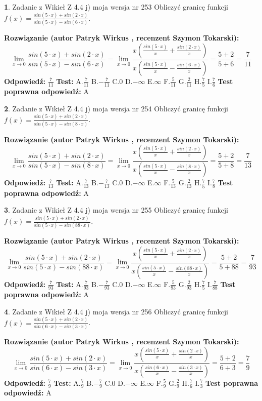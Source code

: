 \documentclass[12pt, a4paper]{article}
\theoremstyle{definition} %
\newtheorem{zad}{}
\newcommand{\zadStart}[1]{\begin{zad}#1\newline}
\newcommand{\zadStop}{\end{zad}}
\newcommand{\rozwStart}[2]{\noindent \textbf{Rozwiązanie (autor #1 , recenzent #2): }\newline}
\newcommand{\rozwStop}{\newline}
\newcommand{\odpStart}{\noindent \textbf{Odpowiedź:}\newline}
\newcommand{\odpStop}{\newline}
\newcommand{\testStart}{\noindent \textbf{Test:}\newline}
\newcommand{\testStop}{\newline}
\newcommand{\kluczStart}{\noindent \textbf{Test poprawna odpowiedź:}\newline}
\newcommand{\kluczStop}{\newline}
\begin{document}
\zadStart{Zadanie z Wikieł Z 4.4 j) moja wersja nr 253}
Obliczyć granicę funkcji $f(x)=\frac{sin(5\cdot x) +sin(2\cdot x)}{sin(5\cdot x) -sin(6\cdot x)}$.
\zadStop
\rozwStart{Patryk Wirkus}{Szymon Tokarski}
$$\lim\limits_{x\to 0}\frac{sin(5\cdot x) +sin(2\cdot x)}{sin(5\cdot x) -sin(6\cdot x)}=\lim\limits_{x\to 0}\frac{x(\frac{sin(5\cdot x)}{x}+\frac{sin(2\cdot x)}{x})}{x(\frac{sin(5\cdot x)}{x}-\frac{sin(6\cdot x)}{x})}=\frac{5+2}{5+6} = \frac{7}{11}$$
\rozwStop
\odpStart
$\frac{7}{11}$
\odpStop
\testStart
A.$\frac{7}{11}$
B.$-\frac{7}{11}$
C.$0$
D.$-\infty$
E.$\infty$
F.$\frac{5}{11}$
G.$\frac{2}{11}$
H.$\frac{7}{5}$
I.$\frac{7}{6}$
\testStop
\kluczStart
A
\kluczStop



\zadStart{Zadanie z Wikieł Z 4.4 j) moja wersja nr 254}
Obliczyć granicę funkcji $f(x)=\frac{sin(5\cdot x) +sin(2\cdot x)}{sin(5\cdot x) -sin(8\cdot x)}$.
\zadStop
\rozwStart{Patryk Wirkus}{Szymon Tokarski}
$$\lim\limits_{x\to 0}\frac{sin(5\cdot x) +sin(2\cdot x)}{sin(5\cdot x) -sin(8\cdot x)}=\lim\limits_{x\to 0}\frac{x(\frac{sin(5\cdot x)}{x}+\frac{sin(2\cdot x)}{x})}{x(\frac{sin(5\cdot x)}{x}-\frac{sin(8\cdot x)}{x})}=\frac{5+2}{5+8} = \frac{7}{13}$$
\rozwStop
\odpStart
$\frac{7}{13}$
\odpStop
\testStart
A.$\frac{7}{13}$
B.$-\frac{7}{13}$
C.$0$
D.$-\infty$
E.$\infty$
F.$\frac{5}{13}$
G.$\frac{2}{13}$
H.$\frac{7}{5}$
I.$\frac{7}{8}$
\testStop
\kluczStart
A
\kluczStop



\zadStart{Zadanie z Wikieł Z 4.4 j) moja wersja nr 255}
Obliczyć granicę funkcji $f(x)=\frac{sin(5\cdot x) +sin(2\cdot x)}{sin(5\cdot x) -sin(88\cdot x)}$.
\zadStop
\rozwStart{Patryk Wirkus}{Szymon Tokarski}
$$\lim\limits_{x\to 0}\frac{sin(5\cdot x) +sin(2\cdot x)}{sin(5\cdot x) -sin(88\cdot x)}=\lim\limits_{x\to 0}\frac{x(\frac{sin(5\cdot x)}{x}+\frac{sin(2\cdot x)}{x})}{x(\frac{sin(5\cdot x)}{x}-\frac{sin(88\cdot x)}{x})}=\frac{5+2}{5+88} = \frac{7}{93}$$
\rozwStop
\odpStart
$\frac{7}{93}$
\odpStop
\testStart
A.$\frac{7}{93}$
B.$-\frac{7}{93}$
C.$0$
D.$-\infty$
E.$\infty$
F.$\frac{5}{93}$
G.$\frac{2}{93}$
H.$\frac{7}{5}$
I.$\frac{7}{88}$
\testStop
\kluczStart
A
\kluczStop



\zadStart{Zadanie z Wikieł Z 4.4 j) moja wersja nr 256}
Obliczyć granicę funkcji $f(x)=\frac{sin(5\cdot x) +sin(2\cdot x)}{sin(6\cdot x) -sin(3\cdot x)}$.
\zadStop
\rozwStart{Patryk Wirkus}{Szymon Tokarski}
$$\lim\limits_{x\to 0}\frac{sin(5\cdot x) +sin(2\cdot x)}{sin(6\cdot x) -sin(3\cdot x)}=\lim\limits_{x\to 0}\frac{x(\frac{sin(5\cdot x)}{x}+\frac{sin(2\cdot x)}{x})}{x(\frac{sin(6\cdot x)}{x}-\frac{sin(3\cdot x)}{x})}=\frac{5+2}{6+3} = \frac{7}{9}$$
\rozwStop
\odpStart
$\frac{7}{9}$
\odpStop
\testStart
A.$\frac{7}{9}$
B.$-\frac{7}{9}$
C.$0$
D.$-\infty$
E.$\infty$
F.$\frac{5}{9}$
G.$\frac{2}{9}$
H.$\frac{7}{6}$
I.$\frac{7}{3}$
\testStop
\kluczStart
A
\kluczStop
\end{document}
